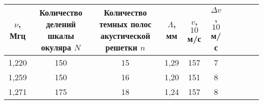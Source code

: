 \begin{tabular}{|c|c|c|c|c|c|c|c|c|c|}
\hline
$\nu$, Мгц& \specialcell{Количество делений \\ шкалы окуляра $N$}&\specialcell{Количество темных полос \\ акустической решетки $n$}&$\Lambda$, мм&$v$, $10$ м/с&$\Delta v$, $10$ м/с\\
\hline
1,220&150&15&1,29&157&7\\
\hline
1,259&150&16&1,20&151&8\\
\hline
1,271&175&18&1,24&157&8\\
\hline
\end{tabular}

